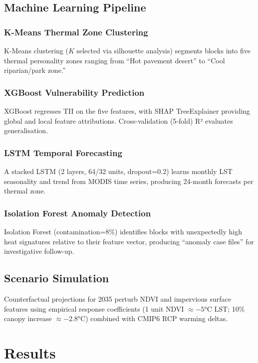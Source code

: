 \documentclass[12pt, a4paper]{article}
\begin{document}
\subsection{Machine Learning Pipeline}

\subsubsection{K-Means Thermal Zone Clustering}
K-Means clustering ($K$ selected via silhouette analysis) segments blocks into
five thermal personality zones ranging from ``Hot pavement desert'' to
``Cool riparian/park zone.''

\subsubsection{XGBoost Vulnerability Prediction}
XGBoost regresses TII on the five features, with SHAP TreeExplainer
providing global and local feature attributions. Cross-validation (5-fold) R²
evaluates generalisation.

\subsubsection{LSTM Temporal Forecasting}
A stacked LSTM (2 layers, 64/32 units, dropout=0.2) learns monthly LST
seasonality and trend from MODIS time series, producing 24-month forecasts
per thermal zone.

\subsubsection{Isolation Forest Anomaly Detection}
Isolation Forest (contamination=8\%) identifies blocks with unexpectedly high
heat signatures relative to their feature vector, producing ``anomaly case files''
for investigative follow-up.

\subsection{Scenario Simulation}

Counterfactual projections for 2035 perturb NDVI and impervious surface features
using empirical response coefficients (1 unit NDVI $\approx -5$°C LST;
10\% canopy increase $\approx -2.8$°C) combined with CMIP6 RCP warming deltas.

\section{Results}
\end{document}
